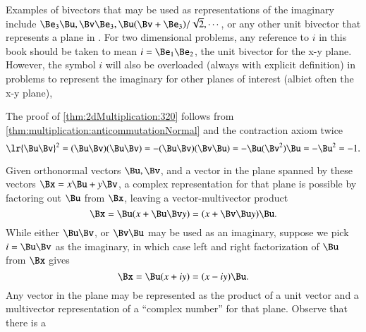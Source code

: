 %
%

Examples of bivectors that may be used as representations of the imaginary include \( \Be_3 \Bu, \Bv \Be_3, \Bu (\Bv + \Be_3)/\sqrt{2}, \cdots\), or any other unit bivector that represents a plane in .
For two dimensional problems, any reference to \( i \) in this book should be taken to mean \( i = \Be_1 \Be_2 \), the unit bivector for the x-y plane.
However, the symbol \( i \) will also be overloaded (always with explicit definition) in  problems to represent
the imaginary for other planes of interest (albiet often the x-y plane),

The proof of \cref{thm:2dMultiplication:320} follows from \cref{thm:multiplication:anticommutationNormal} and the
contraction axiom twice
\begin{dmath}\label{eqn:2dMultiplication:220}
   \lr{ \Bu \Bv }^2
   =
   (\Bu \Bv)(\Bu \Bv)
   =
   -(\Bu \Bv)(\Bv \Bu)
   =
   -\Bu (\Bv^2 ) \Bu
   =
   -\Bu^2
   = -1.
\end{dmath}

Given orthonormal vectors \( \Bu, \Bv \), and a vector in the plane spanned by these vectors \( \Bx = x \Bu + y \Bv \), a complex
representation for that plane is possible by factoring out \( \Bu \) from \( \Bx \), leaving a vector-multivector product
\begin{dmath}\label{eqn:complex:3330}
\Bx = \Bu( x + \Bu \Bv y )
    = ( x + \Bv \Bu y ) \Bu.
\end{dmath}
While either \( \Bu \Bv \), or \( \Bv \Bu \) may be used as an imaginary, suppose we pick \( i = \Bu \Bv \) as the imaginary, in which case
left and right factorization of \( \Bu \) from \( \Bx \) gives
\begin{dmath}\label{eqn:complex:3350}
\Bx = \Bu ( x + i y )
    = ( x - i y ) \Bu.
\end{dmath}
Any vector in the plane may be represented as the product of a unit vector and a multivector representation of a ``complex number'' for that plane.
Observe that there is a

